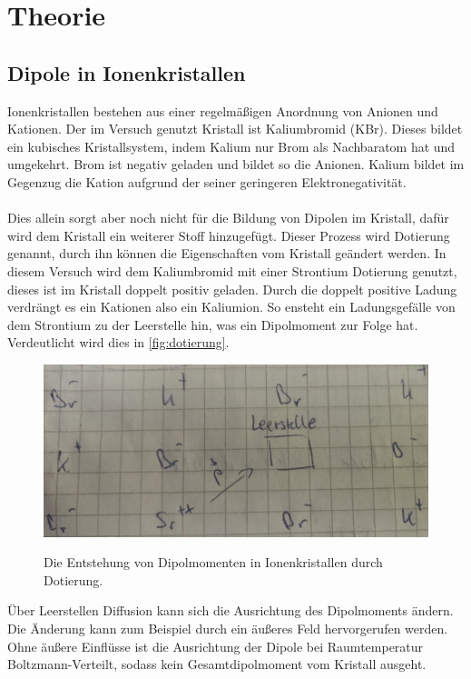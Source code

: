 \section{Theorie}
\label{sec:Theorie}

\subsection{Dipole in Ionenkristallen}
Ionenkristallen bestehen aus einer regelmäßigen Anordnung von Anionen und Kationen.
Der im Versuch genutzt Kristall ist Kaliumbromid (KBr).
Dieses bildet ein kubisches Kristallsystem, indem Kalium nur Brom als Nachbaratom hat und umgekehrt.
Brom ist negativ geladen und bildet so die Anionen.
Kalium bildet im Gegenzug die Kation aufgrund der seiner geringeren Elektronegativität.
\\\\
Dies allein sorgt aber noch nicht für die Bildung von Dipolen im Kristall, dafür wird dem Kristall ein weiterer Stoff hinzugefügt.
Dieser Prozess wird Dotierung genannt, durch ihn können die Eigenschaften vom Kristall geändert werden.
In diesem Versuch wird dem Kaliumbromid mit einer Strontium Dotierung genutzt, dieses ist im Kristall doppelt positiv geladen.
Durch die doppelt positive Ladung verdrängt es ein Kationen also ein Kaliumion.
So ensteht ein Ladungsgefälle von dem Strontium zu der Leerstelle hin, was ein Dipolmoment zur Folge hat.
Verdeutlicht wird dies in \autoref{fig:dotierung}.
\begin{figure}
    \centering
    \caption{Die Entstehung von Dipolmomenten in Ionenkristallen durch Dotierung.}
    \includegraphics[width=\textwidth]{content/data/dotierung.jpeg}
    \label{fig:dotierung}
\end{figure}
Über Leerstellen Diffusion kann sich die Ausrichtung des Dipolmoments ändern.
Die Änderung kann zum Beispiel durch ein äußeres Feld hervorgerufen werden.
Ohne äußere Einflüsse ist die Ausrichtung der Dipole bei Raumtemperatur Boltzmann-Verteilt, sodass kein Gesamtdipolmoment vom Kristall ausgeht.
